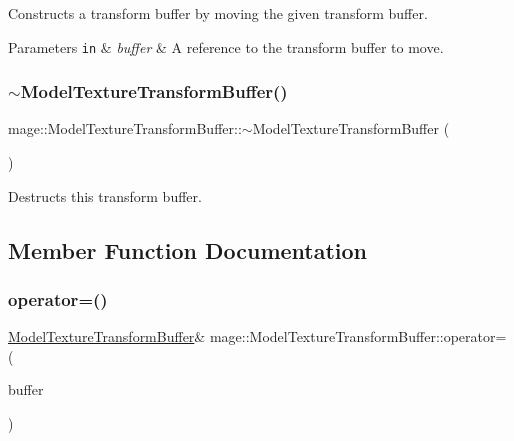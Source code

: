 Constructs a transform buffer by moving the given transform buffer.


\begin{DoxyParams}[1]{Parameters}
\mbox{\tt in}  & {\em buffer} & A reference to the transform buffer to move. \\
\hline
\end{DoxyParams}
\hypertarget{structmage_1_1_model_texture_transform_buffer_a855c8ccaefe9bac3fd10cdc143616cd9}{}\label{structmage_1_1_model_texture_transform_buffer_a855c8ccaefe9bac3fd10cdc143616cd9} 
\subsubsection{\texorpdfstring{$\sim$\+Model\+Texture\+Transform\+Buffer()}{~ModelTextureTransformBuffer()}}
{\footnotesize\ttfamily mage\+::\+Model\+Texture\+Transform\+Buffer\+::$\sim$\+Model\+Texture\+Transform\+Buffer (\begin{DoxyParamCaption}{ }\end{DoxyParamCaption})\hspace{0.3cm}{\ttfamily [default]}}

Destructs this transform buffer. 

\subsection{Member Function Documentation}
\hypertarget{structmage_1_1_model_texture_transform_buffer_a4fd72713afb7e68208c0356a2b55f3d9}{}\label{structmage_1_1_model_texture_transform_buffer_a4fd72713afb7e68208c0356a2b55f3d9} 
\subsubsection{\texorpdfstring{operator=()}{operator=()}\hspace{0.1cm}{\footnotesize\ttfamily [1/2]}}
{\footnotesize\ttfamily \hyperlink{structmage_1_1_model_texture_transform_buffer}{Model\+Texture\+Transform\+Buffer}\& mage\+::\+Model\+Texture\+Transform\+Buffer\+::operator= (\begin{DoxyParamCaption}\item[{const \hyperlink{structmage_1_1_model_texture_transform_buffer}{Model\+Texture\+Transform\+Buffer} \&}]{buffer }\end{DoxyParamCaption})\hspace{0.3cm}{\ttfamily [default]}}

